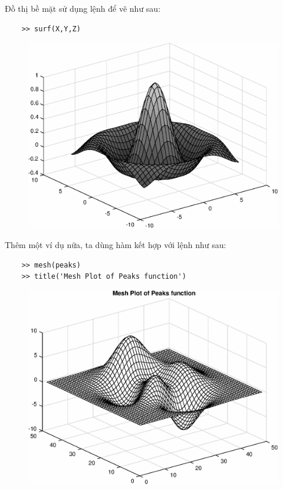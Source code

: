 \documentclass[12pt,a4paper]{article}
\begin{document}
Đồ thị bề mặt sử dụng lệnh  để vẽ như sau:
\begin{lstlisting}
	>> surf(X,Y,Z)
\end{lstlisting}
\begin{center}
	\begin{figure}[H]
	\begin{center}
		\includegraphics[scale=0.6]{hinhtieuluan/dothi17}
	\end{center}
		\caption{}
		\label{refdothi17}
	\end{figure}
\end{center}
Thêm một ví dụ nữa, ta dùng hàm  kết hợp với lệnh  như sau:
\begin{lstlisting}
	>> mesh(peaks)
	>> title('Mesh Plot of Peaks function')
\end{lstlisting}
\begin{center}
	\begin{figure}[H]
	\begin{center}
		\includegraphics[scale=0.6]{hinhtieuluan/dothi18}
	\end{center}
		\caption{}
		\label{refdothi18}
	\end{figure}
\end{center}
\end{document}

